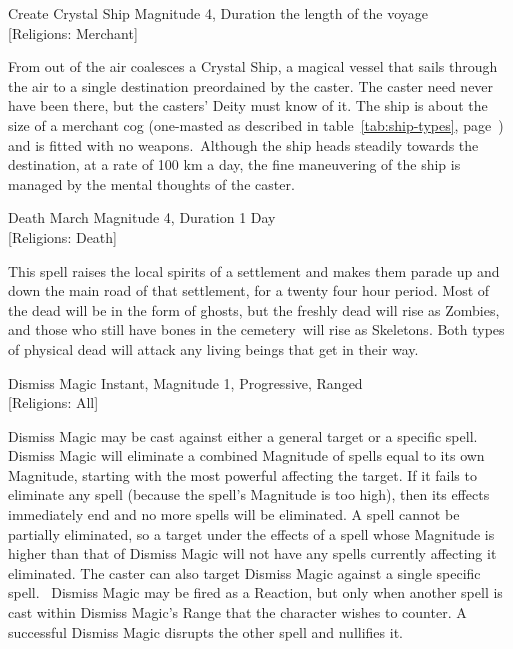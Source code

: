 \begin{samepage}
\begin{rpg-spell}
{Create Crystal Ship}
{Magnitude 4, Duration the length of the voyage\\{[Religions: Merchant]}}

	From out of the air coalesces a Crystal Ship, a magical vessel that sails through the air to a single destination preordained by the caster. The caster need never have been there, but the casters’ Deity must know of it. The ship is about the size of a merchant cog (one-masted as described in table~\ref{tab:ship-types}, page~\pageref{tab:ship-types}) and is fitted with no weapons. Although the ship heads steadily towards the destination, at a rate of 100 km a day, the fine maneuvering of the ship is managed by the mental thoughts of the caster.
\end{rpg-spell}
\end{samepage}

\begin{samepage}
\begin{rpg-spell}
{Death March}
{Magnitude 4, Duration 1 Day\\{[Religions: Death]}}

This spell raises the local spirits of a settlement and makes them parade up and down the main road of that settlement, for a twenty four hour period. Most of the dead will be in the form of ghosts, but the freshly dead will rise as Zombies, and those who still have bones in the cemetery will rise as Skeletons. Both types of physical dead will attack any living beings that get in their way. 
\end{rpg-spell}
\end{samepage}

\begin{samepage}
\begin{rpg-spell}
{Dismiss Magic}
{Instant, Magnitude 1, Progressive, Ranged\\{[Religions: All]}}

Dismiss Magic may be cast against either a general target or a specific spell. Dismiss Magic will eliminate a combined Magnitude of spells equal to its own Magnitude, starting with the most powerful affecting the target. If it fails to eliminate any spell (because the spell’s Magnitude is too high), then its effects immediately end and no more spells will be eliminated. A spell cannot be partially eliminated, so a target under the effects of a spell whose Magnitude is higher than that of Dismiss Magic will not have any spells currently affecting it eliminated. The caster can also target Dismiss Magic against a single specific spell. 
Dismiss Magic may be fired as a Reaction, but only when another spell is cast within Dismiss Magic’s Range that the character wishes to counter. A successful Dismiss Magic disrupts the other spell and nullifies it. 
\end{rpg-spell}
\end{samepage}


